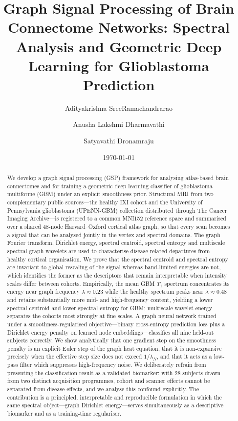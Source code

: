 \documentclass[11pt,reqno]{amsart}
\title[GSP of Brain Connectome Networks]{Graph Signal Processing of Brain
Connectome Networks: Spectral Analysis and Geometric Deep Learning for
Glioblastoma Prediction}
\author[A. SreeRamachandrarao]{Adityakrishna SreeRamachandrarao}
\author[A. L. Dharmavathi]{Anusha Lakshmi Dharmavathi}
\author[S. Dronamraju]{Satyavathi Dronamraju}
\date{\today}
\theoremstyle{plain}
\theoremstyle{definition}
\theoremstyle{remark}
\numberwithin{equation}{section}
\begin{document}
\begin{abstract}
We develop a graph signal processing (GSP) framework for analysing atlas-based
brain connectomes and for training a geometric deep learning classifier of
glioblastoma multiforme (GBM) under an explicit smoothness prior. Structural MRI
from two complementary public sources---the healthy IXI cohort and the
University of Pennsylvania glioblastoma (UPENN-GBM) collection distributed
through The Cancer Imaging Archive---is registered to a common MNI152 reference
space and summarised over a shared $48$-node Harvard--Oxford cortical atlas
graph, so that every scan becomes a signal that can be analysed jointly in the
vertex and spectral domains. The graph Fourier transform, Dirichlet energy,
spectral centroid, spectral entropy and multiscale spectral graph wavelets are
used to characterise disease-related departures from healthy cortical
organisation. We prove that the spectral centroid and spectral entropy are
invariant to global rescaling of the signal whereas band-limited energies are
not, which identifies the former as the descriptors that remain interpretable
when intensity scales differ between cohorts. Empirically, the mean GBM
$T_1$ spectrum concentrates its energy near graph frequency $\lambda \approx
0.23$ while the healthy spectrum peaks near $\lambda \approx 0.48$ and retains
substantially more mid- and high-frequency content, yielding a lower spectral
centroid and lower spectral entropy for GBM; multiscale wavelet energy separates
the cohorts most strongly at fine scales. A graph neural network trained under a
smoothness-regularised objective---binary cross-entropy prediction loss plus a
Dirichlet energy penalty on learned node embeddings---classifies all nine
held-out subjects correctly. We show analytically that one gradient step on the
smoothness penalty is an explicit Euler step of the graph heat equation, that it
is non-expansive precisely when the effective step size does not exceed
$1/\lambda_N$, and that it acts as a low-pass filter which suppresses
high-frequency noise. We deliberately refrain from presenting the classification
result as a validated biomarker: with $28$ subjects drawn from two distinct
acquisition programmes, cohort and scanner effects cannot be separated from
disease effects, and we analyse this confound explicitly. The contribution is a
principled, interpretable and reproducible formulation in which the same
spectral object---graph Dirichlet energy---serves simultaneously as a
descriptive biomarker and as a training-time regulariser.
\end{abstract}
\end{document}
